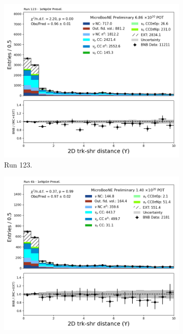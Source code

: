 \begin{figure}[H]
    \centering
    \begin{subfigure}[t]{0.32\linewidth}
        \includegraphics[width=\linewidth]{technote/Appendix_Preselection/Figures/1eNp0pi/Run123/trkshrhitdist2_Run123_1eNp0pi_Presel.png}
        \caption{Run 123.}
    \end{subfigure}%
    \hspace{0.2cm}%
    \begin{subfigure}[t]{0.32\linewidth}
        \includegraphics[width=\linewidth]{technote/Appendix_Preselection/Figures/1eNp0pi/Run4b/trkshrhitdist2_Run4b_1eNp0pi_Presel.png}

\end{subfigure}
\end{figure}
